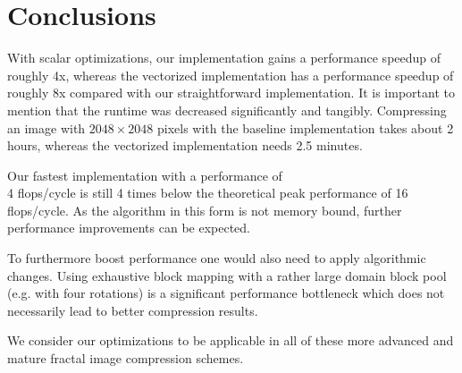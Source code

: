 \section{Conclusions}

With scalar optimizations, our implementation gains a performance speedup
of roughly 4x, whereas the vectorized implementation has a performance speedup
of roughly 8x compared with our straightforward implementation. It is important
to mention that the runtime was decreased significantly and tangibly. Compressing
an image with $2048 \times 2048$ pixels with the baseline implementation takes 
about 2 hours, whereas the vectorized implementation needs 2.5 minutes.

Our fastest implementation with a performance of \\
4 flops/cycle is still 4 times
below the theoretical peak performance of 16 flops/cycle. As the algorithm
in this form is not memory bound, further performance improvements can be expected.

To furthermore boost performance one would also need to apply algorithmic changes. 
Using exhaustive block mapping with a rather large
domain block pool (e.g. with four rotations) is a significant performance
bottleneck which does not necessarily lead to better compression results.

We consider our optimizations to be applicable in all of these more advanced
and mature fractal image compression schemes.
